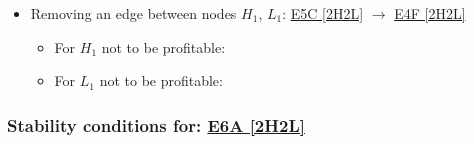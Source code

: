 \begin{itemize}
\begin{itemize}
	\end{itemize}

	\item Removing an edge between nodes $H_1$, $L_1$: \hyperref[apx:E5C:2H2L]{E5C [2H2L]} $\to$ \hyperref[apx:E4F:2H2L]{E4F [2H2L]}

	\begin{itemize}

		\item For $H_1$ not to be profitable:


		\item For $L_1$ not to be profitable:


	\end{itemize}

\end{itemize}



\subsubsection{Stability conditions for: \hyperref[apx:E6A:2H2L]{E6A [2H2L]}}
\label{apx:E6A:2H2L_stability_cond}

